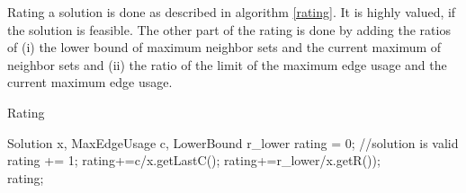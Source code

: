 \documentclass [12pt]{article}
\begin{document}
Rating a solution is done as described in algorithm \ref{rating}. It is highly valued, if the solution is
feasible. The other part of the rating is done by adding the ratios of (i) the lower bound of maximum neighbor sets and the current maximum of neighbor sets and
(ii) the ratio of the limit of the maximum edge usage and the current maximum edge usage.
\begin {algorithm} [H]
\caption {Rating}
\label {rating}
\begin {algorithmic} [3]
\Require Solution x, MaxEdgeUsage c, LowerBound r\_lower
\State rating = 0;
\State //solution is valid
    rating += 1;
\EndIf
\State rating+=c/x.getLastC();
\State rating+=r\_lower/x.getR());\\
\Return rating;

\end {algorithmic}
\end {algorithm}
\end{document}
